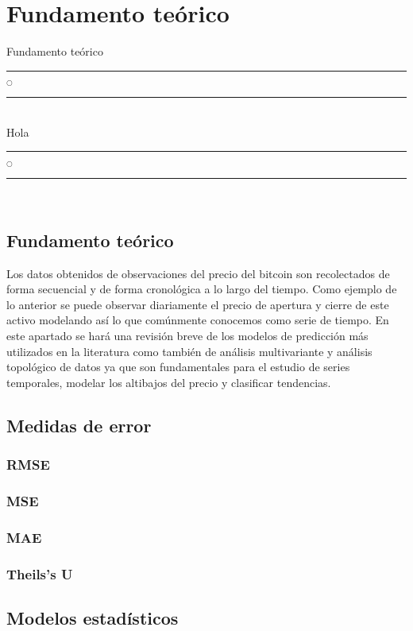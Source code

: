 \chapter[Fundamento teórico]{Fundamento teórico}{Fundamento teórico}\label{Fundamento}

\noindent
\rule{0.49\textwidth}{0.75pt} $_{\bigcirc}$ \rule{0.49\textwidth}{0.75pt}\\
Hola\\
\noindent
\rule{0.49\textwidth}{0.75pt} $_{\bigcirc}$ \rule{0.49\textwidth}{0.75pt}\\
\clearpage

\section{Fundamento teórico}

Los datos obtenidos de observaciones del precio del bitcoin son recolectados de forma secuencial y de forma cronológica a lo largo del tiempo. Como ejemplo de lo anterior se puede observar diariamente el precio de apertura y cierre de este activo modelando así lo que comúnmente conocemos como serie de tiempo. En este apartado se hará una revisión breve de los modelos de predicción más utilizados en la literatura como también de análisis multivariante y análisis topológico de datos ya que son fundamentales para el estudio de series temporales, modelar los altibajos del precio y clasificar tendencias.

\section{Medidas de error}

\subsection{RMSE}
\subsection{MSE}
\subsection{MAE}
\subsection{Theils's U}

\section{Modelos estadísticos}

